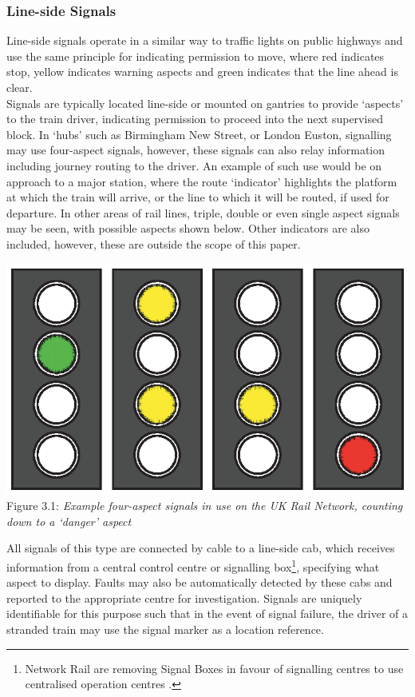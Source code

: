 \documentclass[twoside,11pt,a4paper]{article}
\begin{document}
\subsubsection{Line-side Signals}
Line-side signals operate in a similar way to traffic lights on public highways and use the same principle for indicating permission to move, where red indicates stop, yellow indicates warning aspects and green indicates that the line ahead is clear.\\
Signals are typically located line-side or mounted on gantries to provide `aspects' to the train driver, indicating permission to proceed into the next supervised block. In `hubs' such as Birmingham New Street, or London Euston, signalling may use four-aspect signals, however, these signals can also relay information including journey routing to the driver. An example of such use would be on approach to a major station, where the route `indicator' highlights the platform at which the train will arrive, or the line to which it will be routed, if used for departure. In other areas of rail lines, triple, double or even single aspect signals may be seen, with possible aspects shown below. Other indicators are also included, however, these are outside the scope of this paper.
\begin{center}
 \includegraphics[scale=.7]{Signals.eps}\\
Figure 3.1: \textit{Example four-aspect signals in use on the UK Rail Network, counting down to a `danger' aspect}
\end{center}

All signals of this type are connected by cable to a line-side cab, which receives information from a central control centre or signalling box\footnote{Network Rail are removing Signal Boxes in favour of signalling centres to use centralised operation centres \citep{GlobalRailNews11a}.}, specifying what aspect to display. Faults may also be automatically detected by these cabs and reported to the appropriate centre for investigation. Signals are uniquely identifiable for this purpose such that in the event of signal failure, the driver of a stranded train may use the signal marker as a location reference.
\end{document}
